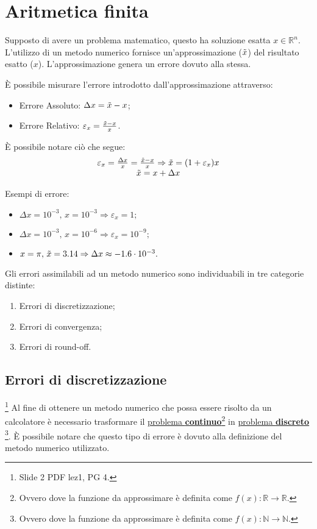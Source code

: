 \section{Aritmetica finita}
Supposto di avere un problema matematico, questo ha soluzione esatta $x \in\mathbb R^n$. L'utilizzo di un metodo numerico fornisce un'approssimazione ($\Tilde{x}$) del risultato esatto ($x$). L'approssimazione genera un errore dovuto alla stessa.

È possibile misurare l'errore introdotto dall'approssimazione attraverso:
\begin{itemize}
    \item Errore Assoluto: $\Delta x = \Tilde{x}-x$;
    \item Errore Relativo: $\varepsilon_x=\frac{\Tilde{x}-x}{x}$. 
\end{itemize}

È possibile notare ciò che segue:
\begin{equation*}
    \begin{matrix}
        \varepsilon_x=\frac{\Delta x}{x}=\frac{\Tilde{x}-x}{x}\Rightarrow \Tilde{x}=(1+\varepsilon_x)x\\
        \Tilde{x}=x+\Delta x
    \end{matrix}
\end{equation*}

Esempi di errore:
\begin{itemize}
    \item $\Delta x = 10^{-3},\, x=10^{-3}\Rightarrow \varepsilon_x = 1;$
    \item  $\Delta x = 10^{-3},\, x=10^{-6}\Rightarrow\varepsilon_x = 10^{-9};$
    \item $x=\pi,\,\Tilde{x}=3.14 \Rightarrow\Delta x \approx -1.6\cdot 10^{-3}.$
\end{itemize}

Gli errori assimilabili ad un metodo numerico sono individuabili in tre categorie distinte:
\begin{enumerate}
    \item Errori di discretizzazione;
    \item Errori di convergenza;
    \item Errori di round-off.
\end{enumerate}

\subsection{Errori di discretizzazione}\footnote{Slide 2 PDF lez1, PG 4.}
Al fine di ottenere un metodo numerico che possa essere risolto da un calcolatore è necessario trasformare il \underline{problema \textbf{continuo}}\footnote{Ovvero dove la funzione da approssimare è definita come $f(x):\mathbb R\rightarrow\mathbb R$.} in \underline{problema \textbf{discreto}} \footnote{Ovvero dove la funzione da approssimare è definita come $f(x):\mathbb N\rightarrow\mathbb N$.}. È possibile notare che questo tipo di errore è dovuto alla definizione del metodo numerico utilizzato.

